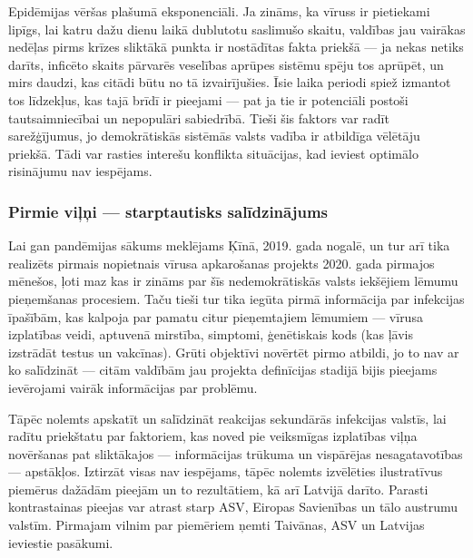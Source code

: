 \documentclass[12pt, a4paper]{article}
\numberwithin{equation}{section} %
\begin{document}
Epidēmijas vēršas plašumā eksponenciāli. Ja zināms, ka vīruss ir pietiekami lipīgs, lai katru dažu dienu laikā dublutotu saslimušo skaitu, valdības jau vairākas nedēļas pirms krīzes sliktākā punkta ir nostādītas fakta priekšā --- ja nekas netiks darīts, inficēto skaits pārvarēs veselības aprūpes sistēmu spēju tos aprūpēt, un mirs daudzi, kas citādi būtu no tā izvairījušies. Īsie laika periodi spiež izmantot tos līdzekļus, kas tajā brīdī ir pieejami --- pat ja tie ir potenciāli postoši tautsaimniecībai un nepopulāri sabiedrībā. Tieši šis faktors var radīt sarežģījumus, jo demokrātiskās sistēmās valsts vadība ir atbildīga vēlētāju priekšā. Tādi var rasties interešu konflikta situācijas, kad ieviest optimālo risinājumu nav iespējams.

\subsubsection{Pirmie viļņi --- starptautisks salīdzinājums}

Lai gan pandēmijas sākums meklējams Ķīnā, 2019. gada nogalē, un tur arī tika realizēts pirmais nopietnais vīrusa apkarošanas projekts 2020. gada pirmajos mēnešos, ļoti maz kas ir zināms par šīs nedemokrātiskās valsts iekšējiem lēmumu pieņemšanas procesiem. Taču tieši tur tika iegūta pirmā informācija par infekcijas īpašībām, kas kalpoja par pamatu citur pieņemtajiem lēmumiem --- vīrusa izplatības veidi, aptuvenā mirstība, simptomi, ģenētiskais kods (kas ļāvis izstrādāt testus un vakcīnas). Grūti objektīvi novērtēt pirmo atbildi, jo to nav ar ko salīdzināt --- citām valdībām jau projekta definīcijas stadijā bijis pieejams ievērojami vairāk informācijas par problēmu. 

Tāpēc nolemts apskatīt un salīdzināt reakcijas sekundārās infekcijas valstīs, lai radītu priekštatu par faktoriem, kas noved pie veiksmīgas izplatības viļņa novēršanas pat sliktākajos --- informācijas trūkuma un vispārējas nesagatavotības --- apstākļos. Iztirzāt visas nav iespējams, tāpēc nolemts izvēlēties ilustratīvus piemērus dažādām pieejām un to rezultātiem, kā arī Latvijā darīto. Parasti kontrastainas pieejas var atrast starp ASV, Eiropas Savienības un tālo austrumu valstīm. Pirmajam vilnim par piemēriem ņemti Taivānas, ASV un Latvijas ieviestie pasākumi.
\end{document}

